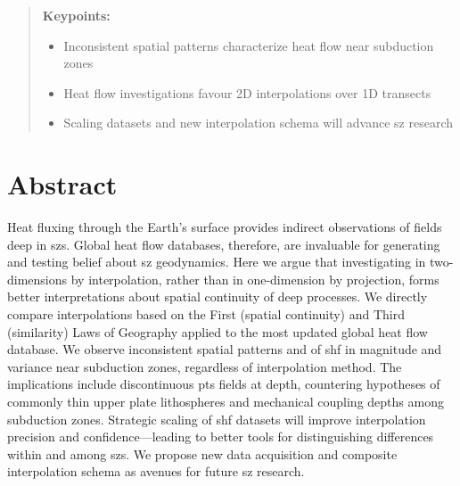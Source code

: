 \begin{quote}
\textbf{Keypoints:}

\begin{itemize}
\item
  Inconsistent spatial patterns characterize heat flow near subduction zones
\item
  Heat flow investigations favour 2D interpolations over 1D transects
\item
  Scaling datasets and new interpolation schema will advance \gls{sz} research
\end{itemize}
\end{quote}

\hypertarget{abstract-1}{%
\section{Abstract}\label{abstract-1}}

Heat fluxing through the Earth's surface provides indirect observations of  fields deep in \glspl{sz}. Global heat flow databases, therefore, are invaluable for generating and testing belief about \gls{sz} geodynamics. Here we argue that investigating  in two-dimensions by interpolation, rather than in one-dimension by projection, forms better interpretations about spatial continuity of deep processes. We directly compare interpolations based on the First (spatial continuity) and Third (similarity) Laws of Geography applied to the most updated global heat flow database. We observe inconsistent spatial patterns and of \gls{shf} in magnitude and variance near subduction zones, regardless of interpolation method. The implications include discontinuous \gls{pts} fields at depth, countering hypotheses of commonly thin upper plate lithospheres and mechanical coupling depths among subduction zones. Strategic scaling of \gls{shf} datasets will improve interpolation precision and confidence---leading to better tools for distinguishing differences within and among \glspl{sz}. We propose new data acquisition and composite interpolation schema as avenues for future \gls{sz} research.

\cleardoublepage

\hypertarget{refs}{}
\begin{CSLReferences}{0}{0}
\end{CSLReferences}


\renewcommand\bibname{REFERENCES}
\cleardoublepage
{}



